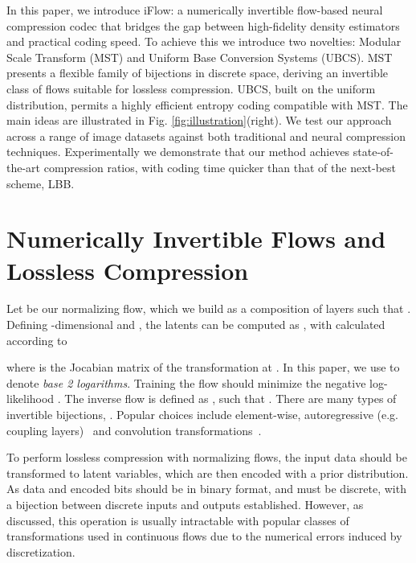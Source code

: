 \documentclass{article}
\begin{document}
In this paper, we introduce iFlow: a numerically invertible flow-based neural compression codec that bridges the gap between high-fidelity density estimators and practical coding speed. To achieve this we introduce two novelties: Modular Scale Transform (MST) and Uniform Base Conversion Systems (UBCS). MST presents a flexible family of bijections in discrete space, deriving an invertible class of flows suitable for lossless compression. UBCS, built on the uniform distribution, permits a highly efficient entropy coding compatible with MST.
The main ideas are illustrated in Fig. \ref{fig:illustration}(right). We test our approach across a range of image datasets against both traditional and neural compression techniques. Experimentally we demonstrate that our method achieves state-of-the-art compression ratios, with coding time  quicker than that of the next-best scheme, LBB.











\section{Numerically Invertible Flows and Lossless Compression}

Let  be our normalizing flow, which we build as a composition of layers such that . Defining  -dimensional  and , the latents can be computed as , with  calculated according to

where  is the Jocabian matrix of the transformation  at . In this paper, we use  to denote \textit{base 2 logarithms}. Training the flow should minimize the negative log-likelihood .
The inverse flow is defined as , such that . There are many types of invertible bijections, . Popular choices include element-wise, autoregressive (e.g. coupling layers)~\cite{zhang2021ivpf} and  convolution transformations~\cite{kingma2018glow}.

To perform lossless compression with normalizing flows, the input data should be transformed to latent variables, which are then encoded with a prior distribution. As data and encoded bits should be in binary format,  and  must be discrete, with a bijection between discrete inputs and outputs established. However, as discussed, this operation is usually intractable with popular classes of transformations used in continuous flows due to the numerical errors induced by discretization.
\end{document}
